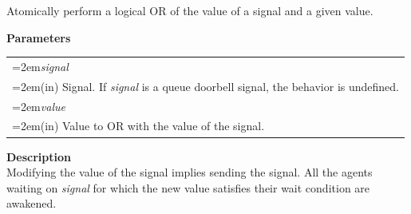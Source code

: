 \documentclass[final]{book}
\newcommand{\hsaarg}[1]{\textit{#1}}
\begin{document}
Atomically perform a logical OR of the value of a signal and a given value.

\noindent\textbf{Parameters}\\[-6mm]
\noindent\begin{longtable}{@{}>{\hangindent=2em}p{\textwidth}}
\hsaarg{signal}\\\hspace{2em}(in) Signal. If \textit{signal} is a queue doorbell signal, the behavior is undefined.\\[2mm]
\hsaarg{value}\\\hspace{2em}(in) Value to OR with the value of the signal.
\end{longtable}
\noindent\textbf{Description}\\[1mm]
Modifying the value of the signal implies sending the signal. All the agents waiting on \textit{signal} for which the new value satisfies their wait condition are awakened. 
\end{document}
